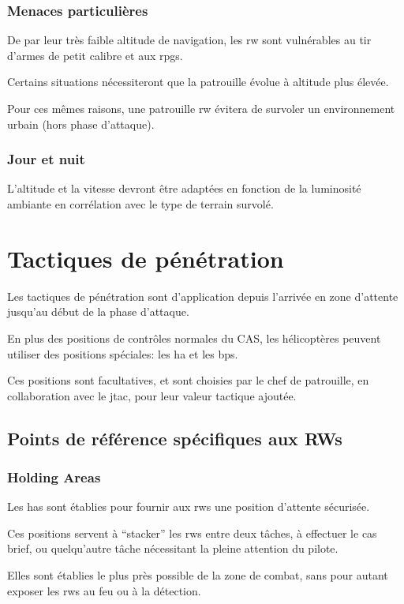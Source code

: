 \subsubsection{Menaces particulières}

\e
    \item De par leur très faible altitude de navigation, les \gls{rw} sont vulnérables au tir d’armes de petit calibre et aux \glspl{rpg}.
    \item Certains situations nécessiteront que la patrouille évolue à altitude plus élevée.
    \item Pour ces mêmes raisons, une patrouille \gls{rw} évitera de survoler un environnement urbain (hors phase d’attaque).
\ed

\subsubsection{Jour et nuit}

\e
    \item L’altitude et la vitesse devront être adaptées en fonction de la luminosité ambiante en corrélation avec le type de terrain survolé.
\ed

\section{Tactiques de pénétration}

\e
    \item Les tactiques de pénétration sont d’application depuis l’arrivée en zone d’attente jusqu’au début de la phase d’attaque.
    \item En plus des positions de contrôles normales du CAS, les hélicoptères peuvent utiliser des positions spéciales: les \gls{ha} et les \glspl{bp}.
    \item Ces positions sont facultatives, et sont choisies par le chef de patrouille, en collaboration avec le \gls{jtac}, pour leur valeur tactique ajoutée.
\ed

\subsection{Points de référence spécifiques aux RWs}

\subsubsection{Holding Areas}

\e
    \item Les \glspl{ha} sont établies pour fournir aux \glspl{rw} une position d’attente sécurisée.
    \item Ces positions servent à “stacker” les \glspl{rw} entre deux tâches, à effectuer le \gls{cas} brief, ou quelqu’autre tâche nécessitant la pleine attention du pilote.
    \item Elles sont établies le plus près possible de la zone de combat, sans pour autant exposer les \glspl{rw} au feu ou à la détection.
\ed

